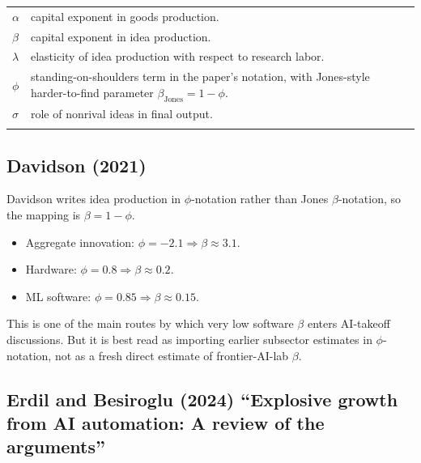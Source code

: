 \documentclass[
  11pt,
  letterpaper,
  DIV=11,
  numbers=noendperiod]{scrartcl}
\providecommand{\tightlist}{%
  \setlength{\itemsep}{0pt}\setlength{\parskip}{0pt}}
\begin{document}
\begin{longtable}[]{@{}
  >{\raggedright\arraybackslash}p{}
  >{\raggedright\arraybackslash}p{}@{}}
\toprule\noalign{}
\endhead
\bottomrule\noalign{}
\endlastfoot
\(\alpha\) & capital exponent in goods production. \\
\(\beta\) & capital exponent in idea production. \\
\(\lambda\) & elasticity of idea production with respect to research
labor. \\
\(\phi\) & standing-on-shoulders term in the paper's notation, with
Jones-style harder-to-find parameter
\(\beta_{\text{Jones}} = 1-\phi\). \\
\(\sigma\) & role of nonrival ideas in final output. \\
& \\
\end{longtable}

\subsection{Davidson (2021)}\label{davidson2021could}

Davidson writes idea production in \(\phi\)-notation rather than Jones
\(\beta\)-notation, so the mapping is \(\beta = 1-\phi\).

\begin{itemize}
\tightlist
\item
  Aggregate innovation: \(\phi=-2.1 \Rightarrow \beta \approx 3.1\).
\item
  Hardware: \(\phi=0.8 \Rightarrow \beta \approx 0.2\).
\item
  ML software: \(\phi=0.85 \Rightarrow \beta \approx 0.15\).
\end{itemize}

This is one of the main routes by which very low software \(\beta\)
enters AI-takeoff discussions. But it is best read as importing earlier
subsector estimates in \(\phi\)-notation, not as a fresh direct estimate
of frontier-AI-lab \(\beta\).

\subsection{Erdil and Besiroglu (2024) ``Explosive growth from AI
automation: A review of the
arguments''}\label{erdil2024explosive-explosive-growth-from-ai-automation-a-review-of-the-arguments}
\end{document}
